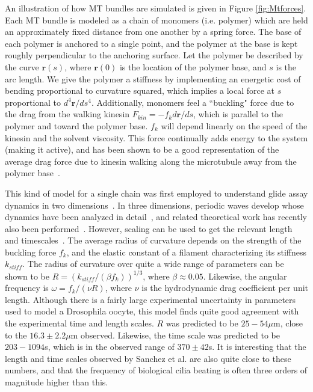 \documentclass[11pt]{ucthesis}
\begin{document}
An illustration of how MT bundles are simulated is given in Figure
\ref{fig:Mtforces}. Each MT bundle is modeled as a chain of monomers
(i.e. polymer) which are held an approximately fixed distance from
one another by a spring force. The base of each polymer is anchored
to a single point, and the polymer at the base is kept roughly
perpendicular to the anchoring surface. Let the polymer be described
by the curve $\mathbf{r}(s)$, where $\mathbf{r}(0)$ is the location
of the polymer base, and $s$ is the arc length. We give the polymer a stiffness by implementing
an energetic cost of bending proportional to curvature squared, which
implies a local force at $s$ proportional to  $d^4\mathbf{r}/ds^4$. Additionally, monomers feel a ``buckling"
force due to the drag from the walking kinesin $F_{kin} = - f_k d\mathbf{r}/ds$, which is parallel to the polymer
and toward the polymer base. $f_k$ will depend linearly on the speed of the kinesin
and the solvent viscosity. This force continually adds energy to
the system (making it active), and has been shown to be a good
representation of the average drag force due to kinesin walking
along the microtubule away from the polymer base~\cite{Monteith2016}.

This kind of model for a single chain was first employed to understand glide assay dynamics
in two dimensions~\cite{bourdieu1995spiral}. In three dimensions,
periodic waves develop whose dynamics have been analyzed in detail~\cite{Monteith2016}, and
related theoretical work has recently also been performed~\cite{de2017spontaneous}. However,
scaling can be used to get the relevant length and timescales~\cite{bourdieu1995spiral}.
The average radius of curvature depends on the strength of the buckling force $f_k$,
and the elastic constant of a filament characterizing its stiffness $k_{stiff}$. The radius of curvature over
quite a wide range of parameters can be shown to be
$R = (k_{stiff}/(\beta f_k))^{1/3}$, where $\beta \approx 0.05$. Likewise, the angular frequency is
$\omega = f_k/(\nu R)$, where $\nu$ is the hydrodynamic drag coefficient per unit length.
Although there is a fairly large experimental uncertainty in parameters
used to model a Drosophila oocyte, this model finds quite good agreement with the experimental
time and length scales. $R$ was predicted to be $25-54\mu$m, close to the $16.3\pm 2.2 \mu$m observed.
Likewise, the time scale was predicted to be $203-1094$s, which is in the observed range of $370\pm 42$s.
It is interesting that the length and time scales observed by Sanchez et al. are also quite close to
these numbers, and that the frequency of biological cilia beating is often three orders of magnitude higher than this.
\end{document}
